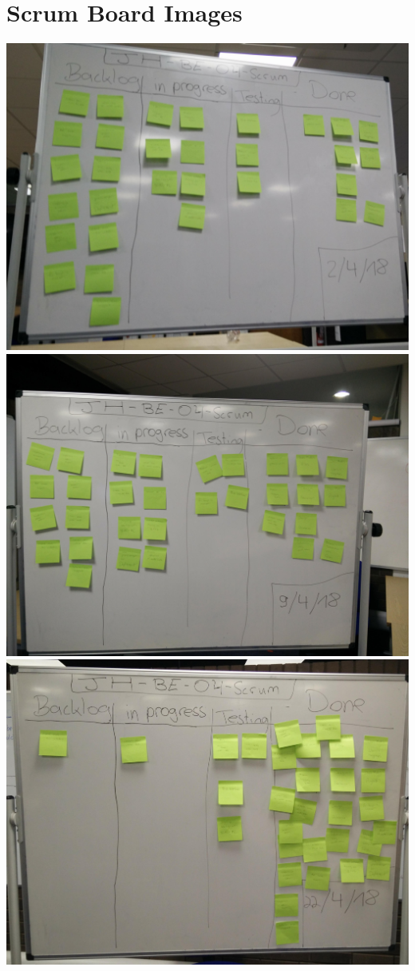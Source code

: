 \section{Scrum Board Images} \label{app:board}

{
\centering
\includegraphics[width=\textwidth]{graphics/scrum.jpg}
\includegraphics[width=\textwidth]{graphics/scrum2.jpg}
\includegraphics[width=\textwidth]{graphics/scrum3.jpg}
}
